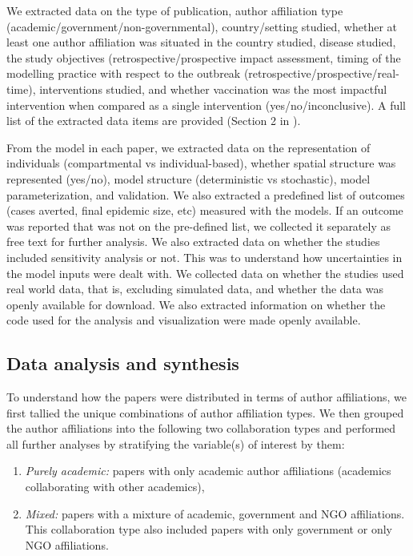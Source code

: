 \documentclass[10pt,letterpaper]{article}
\begin{document}
We extracted data on the type of publication, author affiliation type (academic/government/non-governmental), country/setting studied, whether at least one author affiliation was situated in the country studied, disease studied, the study objectives (retrospective/prospective impact assessment, timing of the modelling practice with respect to the outbreak (retrospective/prospective/real-time), interventions studied, and whether vaccination was the most impactful intervention when compared as a single intervention (yes/no/inconclusive). A full list of the extracted data items are provided (Section 2 in ).  

From the model in each paper, we extracted data on the representation of individuals (compartmental vs individual-based), whether spatial structure was represented (yes/no), model structure (deterministic vs stochastic), model parameterization, and validation. We also extracted a predefined list of outcomes (cases averted, final epidemic size, etc) measured with the models. If an outcome was reported that was not on the pre-defined list, we collected it separately as free text for further analysis. We also extracted data on whether the studies included sensitivity analysis or not. This was to understand how uncertainties in the model inputs were dealt with.  We collected data on whether the studies used real world data, that is, excluding simulated data, and whether the data was openly available for download. We also extracted information on whether the code used for the analysis and visualization were made openly available.


\subsection*{Data analysis and synthesis}
To understand how the papers were distributed in terms of author affiliations, we first tallied the unique combinations of author affiliation types. We then grouped the author affiliations into the following two collaboration types and performed all further analyses by stratifying the variable(s) of interest by them:

\begin{enumerate}
	\item \textit{Purely academic:} papers with only academic author affiliations (academics collaborating with other academics), 
	\item \textit{Mixed:} papers with a mixture of academic, government and NGO affiliations. This collaboration type also included papers with only government or only NGO affiliations. 
\end{enumerate}
\end{document}
